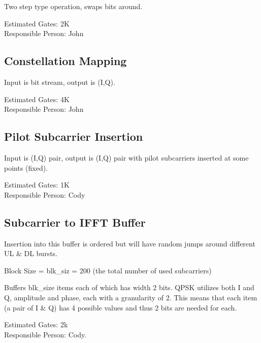 \documentclass[10pt]{article}
\begin{document}
		Two step type operation, swaps bits around.

		Estimated Gates: 2K \\
		Responsible Person: John

	\subsection{Constellation Mapping}
		\label{sec:constellation}

		Input is bit stream, output is (I,Q).

		Estimated Gates: 4K \\
		Responsible Person: John

	\subsection{Pilot Subcarrier Insertion}
		\label{sec:pilot}

		Input is (I,Q) pair, output is (I,Q) pair with pilot subcarriers
		inserted at some points (fixed).

		Estimated Gates: 1K \\
		Responsible Person: Cody

	\subsection{Subcarrier to IFFT Buffer}
		\label{sec:ifft-buffer}
		Insertion into this buffer is ordered but will have random
		jumps around different UL \& DL bursts.

		Block Size = blk\_siz = 200 (the total number of used
		subcarriers)
		
		Buffers blk\_size items each of which has width 2 bits.
		QPSK utilizes both I and Q, amplitude and phase, each with
		a granularity of 2. This means that each item (a pair of I
		\& Q) has 4 possible values and thus 2 bits are needed for
		each.

		Estimated Gates: 2k \\
		Responsible Person: Cody.
\end{document}
